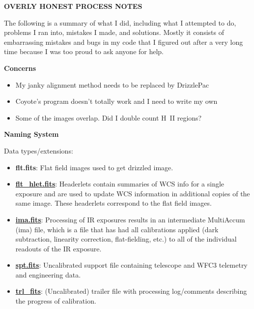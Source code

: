\documentclass[11pt,obeyspaces]{article} %
\begin{document}

\centerline{\bf \LARGE OVERLY HONEST PROCESS NOTES}

\bigskip
\bigskip

The following is a summary of what I did, including what I attempted to do, problems I ran into, mistakes I made, and solutions. Mostly it consists of embarrassing mistakes and bugs in my code that I figured out after a very long time because I was too proud to ask anyone for help. 
\bigskip

\centerline{\bf \Large Concerns}
\begin{itemize}
\item My janky alignment method needs to be replaced by DrizzlePac 
\item Coyote's program doesn't totally work and I need to write my own
\item Some of the images overlap. Did I double count H~II regions?
\end{itemize}

\bigskip
\bigskip

\centerline{\Large \bf Naming System}

Data types/extensions:
\begin{itemize}
\item \textbf{flt.fits}: Flat field images used to get drizzled image.
\item \href{http://documents.stsci.edu/hst/HST_overview/documents/DrizzlePac/ch35.html}{\textbf{flt\_hlet.fits}}: Headerlets contain summaries of WCS info for a single exposure and are used to update WCS information in additional copies of the same image. These headerlets correspond to the flat field images.
\item \href{http://www.stsci.edu/hst/wfc3/documents/handbooks/currentDHB/wfc3_Ch22.html}{\textbf{ima.fits}}: Processing of IR exposures results in an intermediate MultiAccum (ima) file, which is a file that has had all calibrations applied (dark subtraction, linearity correction, flat-fielding, etc.) to all of the individual readouts of the IR exposure. 
\item \href{http://www.stsci.edu/hst/wfc3/documents/handbooks/currentDHB/wfc3_Ch22.html}{\textbf{spt.fits}}: Uncalibrated support file containing telescope and WFC3 telemetry and engineering data. 
\item \href{http://www.stsci.edu/hst/wfc3/documents/handbooks/currentDHB/wfc3_Ch22.html}{\textbf{trl\_fits}}: (Uncalibrated) trailer file with processing log/comments describing the progress of calibration. 
\end{itemize}
\end{document}
